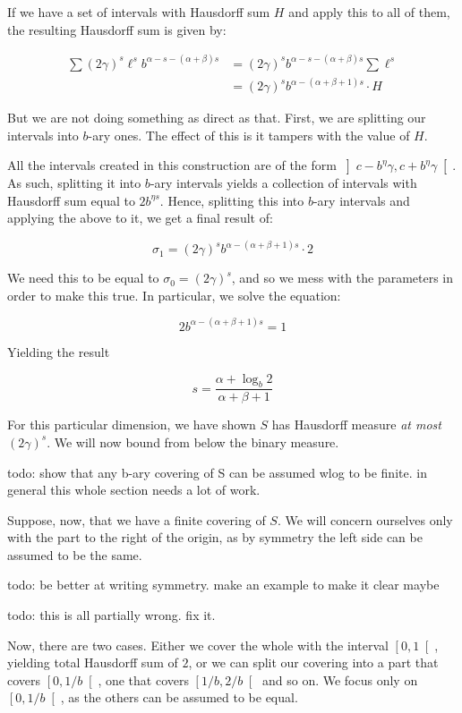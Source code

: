 \documentclass[11pt]{amsart}
\begin{document}
If we have a set of intervals with Hausdorff sum $H$ and apply this to all of them, the resulting Hausdorff sum is given by:

\begin{align*}
\sum (2 \gamma)^s \ell^s b^{\alpha - s - (\alpha + \beta) s} &=
(2 \gamma)^s b^{\alpha - s - (\alpha + \beta) s} \sum \ell^s\\
&= (2 \gamma)^s b^{\alpha - (\alpha + \beta + 1) s} \cdot H
\end{align*}

But we are not doing something as direct as that. First, we are splitting our intervals into $b$-ary ones. The effect of this is it tampers with the value of $H$.

All the intervals created in this construction are of the form $\left] c - b^\eta \gamma, c + b^\eta \gamma \right[$. As such, splitting it into $b$-ary intervals yields a collection of intervals with Hausdorff sum equal to $2 b^{\eta s}$. Hence, splitting this into $b$-ary intervals and applying the above to it, we get a final result of:

\[\sigma_1 = (2 \gamma)^s b^{\alpha - (\alpha + \beta + 1) s} \cdot 2 \]

We need this to be equal to $\sigma_0 = (2 \gamma)^s$, and so we mess with the parameters in order to make this true. In particular, we solve the equation:

\[ 2 b^{\alpha - (\alpha + \beta + 1) s} = 1 \]

Yielding the result

\[s = \frac{\alpha + \log_b 2}{\alpha + \beta + 1}\]

For this particular dimension, we have shown $S$ has Hausdorff measure \emph{at most} $(2 \gamma)^s$. We will now bound from below the binary measure.

todo: show that any b-ary covering of S can be assumed wlog to be finite. in general this whole section needs a lot of work.

Suppose, now, that we have a finite covering of $S$. We will concern ourselves only with the part to the right of the origin, as by symmetry the left side can be assumed to be the same.

todo: be better at writing symmetry. make an example to make it clear maybe

todo: this is all partially wrong. fix it.

Now, there are two cases. Either we cover the whole with the interval $\left[0, 1 \right[$, yielding total Hausdorff sum of $2$, or we can split our covering into a part that covers $\left[0, 1/b \right[$, one that covers $\left[1/b, 2/b\right[$ and so on. We focus only on $\left[0, 1/b \right[$, as the others can be assumed to be equal.
\end{document}
